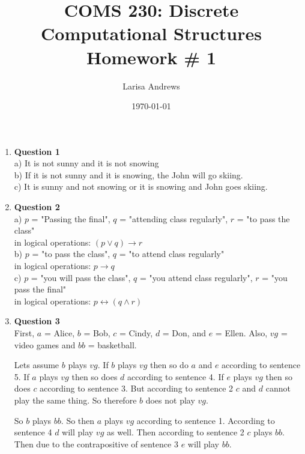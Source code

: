 \documentclass[12pt]{article}
\let\biconditional\leftrightarrow
\begin{document}

\title{
\textbf{COMS 230: Discrete Computational Structures}\\
Homework \# 1 \\}
\author{Larisa Andrews}
\date{\today}
\maketitle

\begin{enumerate}

\item {\bf Question 1} \\
	a) It is not sunny and it is not snowing \\
	b) If it is not sunny and it is snowing, the 		John will go skiing. \\
	c) It is sunny and not snowing or it is snowing 	and John goes skiing. \\ 

\item {\bf Question 2} \\
a) 
   $p$ = "Passing the final",
   $q$ = "attending class regularly",
   $r$ = "to pass the class" \\
   in logical operations: $(p \lor q) \rightarrow r$ \\
b) 
   $p$ = "to pass the class",
   $q$ = "to attend class regularly" \\
   in logical operations: $ p \rightarrow q $ \\
c)
   $p$ = "you will pass the class",
   $q$ = "you attend class regularly",
   $r$ = "you pass the final" \\
   in logical operations: $ p \biconditional (q \wedge r) $


\item {\bf Question 3} \\
First, $a$ = Alice, $b$ = Bob, $c$ = Cindy, $d$ = Don, and $e$ = Ellen. Also, $vg$ = video games and $bb$ = basketball.

Lets assume $b$ plays $vg$. If $b$ plays $vg$ then so do $a$ and $e$ according to sentence 5. If $a$ plays $vg$ then so does $d$ according to sentence 4. If $e$ plays $vg$ then so does $c$ according to sentence 3. But according to sentence 2 $c$ and $d$ cannot play the same thing. So therefore $b$ does not play $vg$. 

So $b$ plays $bb$. So then $a$ plays $vg$ according to sentence 1. According to sentence 4 $d$ will play $vg$ as well. Then according to sentence 2 $c$ plays $bb$. Then due to the contrapositive of sentence 3 $e$ will play $bb$. 



\end{enumerate}
\end{document}

